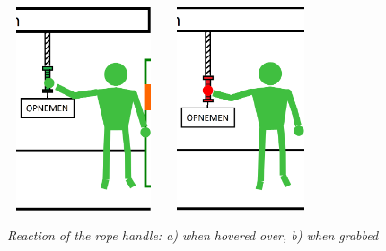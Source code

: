 \begin{figure}[H]
	\begin{center}
		\includegraphics[width=4.5cm, height=6cm]{figures/2_hover_over_rope.png}
		\includegraphics[width=4.5cm, height=6cm]{figures/3_grab_rope.png}
		\caption{\emph{Reaction of the rope handle: a) when hovered over, b) when grabbed}}
		\label{rope handle reaction}
	\end{center}
\end{figure}

